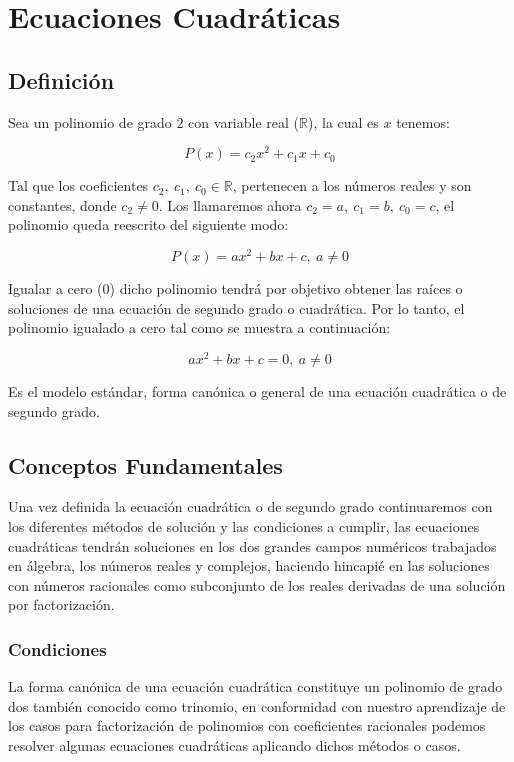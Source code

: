 \documentclass[letterpaper, 10pt, oneside]{book}
\begin{document}
	\chapter{Ecuaciones Cuadráticas}
	\section{Definición}
	Sea un polinomio de grado $2$ con variable real ($\displaystyle{\mathbb{R}}$), la cual es $x$ tenemos: 
	
	$$P(x)=c_2x^2+c_1x+c_0$$
	
	Tal que los coeficientes $\displaystyle{c_2, \ c_1, \ c_0 \in \mathbb{R}}$, pertenecen a los números reales y son constantes, donde $c_2 \neq 0$. Los llamaremos ahora $c_2 = a, \ c_1 = b, \ c_0 = c$, el polinomio queda reescrito del siguiente modo:
	
	$$P(x)=ax^2+bx+c, \ a \neq 0$$
	
	Igualar a cero (0) dicho polinomio tendrá por objetivo obtener las raíces o soluciones de una ecuación de segundo grado o cuadrática. Por lo tanto, el polinomio igualado a cero tal como se muestra a continuación: 
	
	$$ax^2+bx+c=0, \ a \neq 0$$
	
	Es el modelo estándar, forma canónica o    general de una ecuación cuadrática o de segundo grado. 
	
	\section{Conceptos Fundamentales}
	Una vez definida la ecuación cuadrática o de segundo grado continuaremos con los diferentes métodos de solución y las condiciones a cumplir, las ecuaciones cuadráticas tendrán soluciones en los dos grandes campos numéricos trabajados en álgebra, los números reales y complejos, haciendo hincapié en las soluciones con números racionales como subconjunto de los reales derivadas de una solución por factorización. 
	
	\subsection{Condiciones}
	La forma canónica de una ecuación cuadrática constituye un polinomio de grado dos también conocido como trinomio, en conformidad con nuestro aprendizaje de los casos para factorización de polinomios con coeficientes racionales podemos resolver algunas ecuaciones cuadráticas aplicando dichos métodos o casos. 
	
\end{document}
